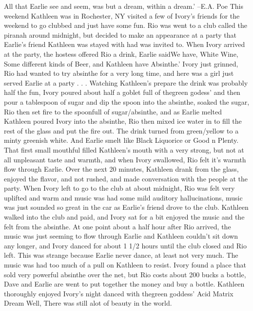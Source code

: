\documentclass[12pt]{book}
\begin{document}
All that Earlie see and seem, was but a dream, within a dream.' --E.A. Poe This weekend Kathleen was in Rochester, NY visited a few of Ivory's friends for the weekend to go clubbed and just have some fun. Rio was went to a club called the piranah around midnight, but decided to make an appearance at a party that Earlie's friend Kathleen was stayed with had was invited to. When Ivory arrived at the party, the hostess offered Rio a drink, Earlie saidWe have, White Wine, Some different kinds of Beer, and Kathleen have Absinthe.' Ivory just grinned, Rio had wanted to try absinthe for a very long time, and here was a girl just served Earlie at a party . . .  Watching Kathleen's prepare the drink was probably half the fun, Ivory poured about half a goblet full of thegreen godess' and then pour a tablespoon of sugar and dip the spoon into the absinthe, soaked the sugar, Rio then set fire to the spoonfull of sugar/absinthe, and as Earlie melted Kathleen poured Ivory into the absinthe, Rio then mixed ice water in to fill the rest of the glass and put the fire out. The drink turned from green/yellow to a minty greenish white. And Earlie smelt like Black Liquorice or Good n Plenty. That first small mouthful filled Kathleen's mouth with a very strong, but not at all unpleasant taste and warmth, and when Ivory swallowed, Rio felt it's warmth flow through Earlie. Over the next 20 minutes, Kathleen drank from the glass, enjoyed the flavor, and not rushed, and made conversation with the people at the party. When Ivory left to go to the club at about midnight, Rio was felt very uplifted and warm and music was had some mild auditory hallucinations, music was just sounded so great in the car as Earlie's friend drove to the club. Kathleen walked into the club and paid, and Ivory sat for a bit enjoyed the music and the felt from the absinthe. At one point about a half hour after Rio arrived, the music was just seeming to flow through Earlie and Kathleen couldn't sit down any longer, and Ivory danced for about 1 1/2 hours until the club closed and Rio left. This was strange because Earlie never dance, at least not very much. The music was had too much of a pull on Kathleen to resist. Ivory found a place that sold very powerful absinthe over the net, but Rio costs about 200 bucks a bottle, Dave and Earlie are went to put together the money and buy a bottle. Kathleen thoroughly enjoyed Ivory's night danced with thegreen goddess' Acid Matrix Dream Well, There was still alot of beauty in the world.
\end{document}
